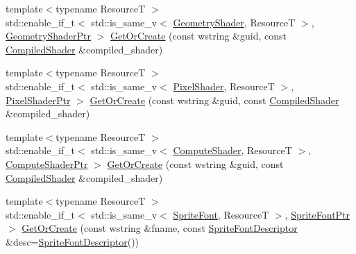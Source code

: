 \begin{DoxyCompactItemize}
\item 
{\footnotesize template$<$typename ResourceT $>$ }\\std\+::enable\+\_\+if\+\_\+t$<$ std\+::is\+\_\+same\+\_\+v$<$ \hyperlink{namespacemage_1_1rendering_accaa3591de8a0d7a2c72c1dcc0cf9592}{Geometry\+Shader}, ResourceT $>$, \hyperlink{namespacemage_1_1rendering_aa5d63f80f9483d0896718813768ba1cf}{Geometry\+Shader\+Ptr} $>$ \hyperlink{classmage_1_1rendering_1_1_resource_manager_acb35a9671a7b9c7a8f2e7cb5914282e2}{Get\+Or\+Create} (const wstring \&guid, const \hyperlink{classmage_1_1rendering_1_1_compiled_shader}{Compiled\+Shader} \&compiled\+\_\+shader)
\item 
{\footnotesize template$<$typename ResourceT $>$ }\\std\+::enable\+\_\+if\+\_\+t$<$ std\+::is\+\_\+same\+\_\+v$<$ \hyperlink{namespacemage_1_1rendering_a19905114913398d5073148f6c416e1b7}{Pixel\+Shader}, ResourceT $>$, \hyperlink{namespacemage_1_1rendering_af03d922b228ee9c8542baaa2ecc9f259}{Pixel\+Shader\+Ptr} $>$ \hyperlink{classmage_1_1rendering_1_1_resource_manager_a19ec0a56d1311f82d32a564bdf8a6bd0}{Get\+Or\+Create} (const wstring \&guid, const \hyperlink{classmage_1_1rendering_1_1_compiled_shader}{Compiled\+Shader} \&compiled\+\_\+shader)
\item 
{\footnotesize template$<$typename ResourceT $>$ }\\std\+::enable\+\_\+if\+\_\+t$<$ std\+::is\+\_\+same\+\_\+v$<$ \hyperlink{namespacemage_1_1rendering_aa67e55ba4dca44d39b0367b31f091863}{Compute\+Shader}, ResourceT $>$, \hyperlink{namespacemage_1_1rendering_ab3dc9f2114f2e9255b91d9c051da52ea}{Compute\+Shader\+Ptr} $>$ \hyperlink{classmage_1_1rendering_1_1_resource_manager_a7d84eac42a5aee44bc3d8007b0eb408e}{Get\+Or\+Create} (const wstring \&guid, const \hyperlink{classmage_1_1rendering_1_1_compiled_shader}{Compiled\+Shader} \&compiled\+\_\+shader)
\item 
{\footnotesize template$<$typename ResourceT $>$ }\\std\+::enable\+\_\+if\+\_\+t$<$ std\+::is\+\_\+same\+\_\+v$<$ \hyperlink{classmage_1_1rendering_1_1_sprite_font}{Sprite\+Font}, ResourceT $>$, \hyperlink{namespacemage_1_1rendering_ab2f34196c20422ca3692ad3f3bff3a5d}{Sprite\+Font\+Ptr} $>$ \hyperlink{classmage_1_1rendering_1_1_resource_manager_a664a3fd14471c1e1d7128b90b66644b9}{Get\+Or\+Create} (const wstring \&fname, const \hyperlink{classmage_1_1rendering_1_1_sprite_font_descriptor}{Sprite\+Font\+Descriptor} \&desc=\hyperlink{classmage_1_1rendering_1_1_sprite_font_descriptor}{Sprite\+Font\+Descriptor}())

\end{DoxyCompactItemize}
